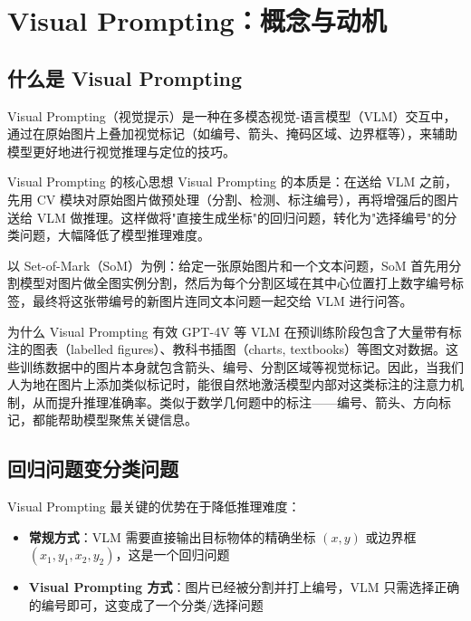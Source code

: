 \section{Visual Prompting：概念与动机}

\subsection{什么是 Visual Prompting}

Visual Prompting（视觉提示）是一种在多模态视觉-语言模型（VLM）交互中，通过在原始图片上叠加视觉标记（如编号、箭头、掩码区域、边界框等），来辅助模型更好地进行视觉推理与定位的技巧。

\begin{importantbox}{Visual Prompting 的核心思想}
Visual Prompting 的本质是：在送给 VLM 之前，先用 CV 模块对原始图片做预处理（分割、检测、标注编号），再将增强后的图片送给 VLM 做推理。这样做将"直接生成坐标"的回归问题，转化为"选择编号"的分类问题，大幅降低了模型推理难度。
\end{importantbox}

以 Set-of-Mark（SoM）为例：给定一张原始图片和一个文本问题，SoM 首先用分割模型对图片做全图实例分割，然后为每个分割区域在其中心位置打上数字编号标签，最终将这张带编号的新图片连同文本问题一起交给 VLM 进行问答。

\begin{knowledgebox}{为什么 Visual Prompting 有效}
GPT-4V 等 VLM 在预训练阶段包含了大量带有标注的图表（labelled figures）、教科书插图（charts, textbooks）等图文对数据。这些训练数据中的图片本身就包含箭头、编号、分割区域等视觉标记。因此，当我们人为地在图片上添加类似标记时，能很自然地激活模型内部对这类标注的注意力机制，从而提升推理准确率。类似于数学几何题中的标注——编号、箭头、方向标记，都能帮助模型聚焦关键信息。
\end{knowledgebox}

\subsection{回归问题变分类问题}

Visual Prompting 最关键的优势在于降低推理难度：

\begin{itemize}
    \item \textbf{常规方式}：VLM 需要直接输出目标物体的精确坐标 $(x, y)$ 或边界框 $(x_1, y_1, x_2, y_2)$，这是一个回归问题
    \item \textbf{Visual Prompting 方式}：图片已经被分割并打上编号，VLM 只需选择正确的编号即可，这变成了一个分类/选择问题
\end{itemize}

